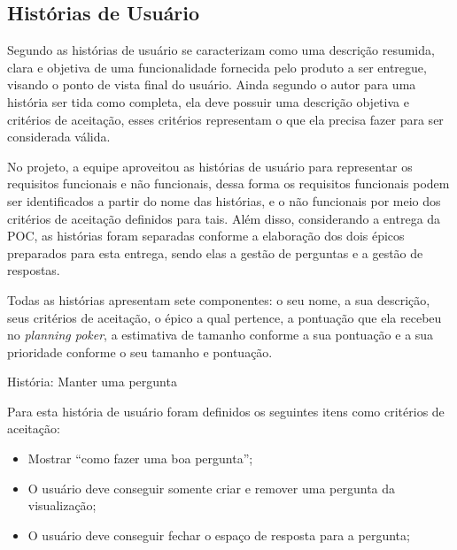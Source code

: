\subsection{Histórias de Usuário}
Segundo  as histórias de usuário se caracterizam como uma descrição resumida, clara e objetiva de uma funcionalidade fornecida pelo produto a ser entregue, visando o ponto de vista final do usuário. Ainda segundo o autor para uma história ser tida como completa, ela deve possuir uma descrição objetiva e critérios de aceitação, esses critérios representam o que ela precisa fazer para ser considerada válida.

No projeto, a equipe aproveitou as histórias de usuário para representar os requisitos funcionais e não funcionais, dessa forma os requisitos funcionais podem ser identificados a partir do nome das histórias, e o não funcionais por meio dos critérios de aceitação definidos para tais. Além disso, considerando a entrega da \acs{POC}, as histórias foram separadas conforme a elaboração dos dois épicos preparados para esta entrega, sendo elas a gestão de perguntas e a gestão de respostas.

Todas as histórias apresentam sete componentes: o seu nome, a sua descrição, seus critérios de aceitação, o épico a qual pertence, a pontuação que ela recebeu no \textsl{planning poker}, a estimativa de tamanho conforme a sua pontuação e a sua prioridade conforme o seu tamanho e pontuação.

\def\arraystretch{2}
\begin{quadro}[htb]
\centering
\ABNTEXfontereduzida
\caption[História: Manter uma pergunta]{História: Manter uma pergunta}
\end{quadro}
\FloatBarrier 

Para esta história de usuário foram definidos os seguintes itens como critérios de aceitação:

\begin{itemize}
\item Mostrar ``como fazer uma boa pergunta'';
\item O usuário deve conseguir somente criar e remover uma pergunta da visualização;
\item O usuário deve conseguir fechar o espaço de resposta para a pergunta;
\end{itemize}

